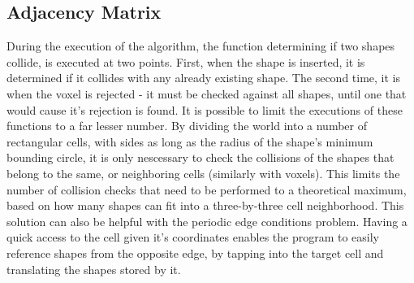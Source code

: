 \documentclass[12pt, oneside]{report}
\begin{document}
\subsection{Adjacency Matrix}

During the execution of the algorithm, the function determining if two shapes collide, is executed at two points. First, when the shape is inserted, it is determined if it collides with any already existing shape. The second time, it is when the voxel is rejected - it must be checked against all shapes, until one that would cause it's rejection is found. It is possible to limit the executions of these functions to a far lesser number. By dividing the world into a number of rectangular cells, with sides as long as the radius of the shape's minimum bounding circle, it is only nescessary to check the collisions of the shapes that belong to the same, or neighboring cells (similarly with voxels). This limits the number of collision checks that need to be performed to a theoretical maximum, based on how many shapes can fit into a three-by-three cell neighborhood. \newline
This solution can also be helpful with the periodic edge conditions problem. Having a quick access to the cell given it's coordinates enables the program to easily reference shapes from the opposite edge, by tapping into the target cell and translating the shapes stored by it.
\end{document}
